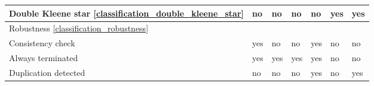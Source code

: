 \begin{center}
\begin{tabular}{| l | l | l | l | l | l | l |}
    Double Kleene star \ref{classification_double_kleene_star} & no & no & no & no & yes & yes \\ \hline
        
    \hline
	\multicolumn{7}{|l|}{Robustness \ref{classification_robustness}} \\ \hline
    Consistency check & yes & no & no & yes & no & no \\ \hline
    Always terminated & yes & yes & yes & yes & no & no \\ \hline  
    Duplication detected & no & no & no & yes & no & yes \\  \hline
  \end{tabular}
  \end{center}